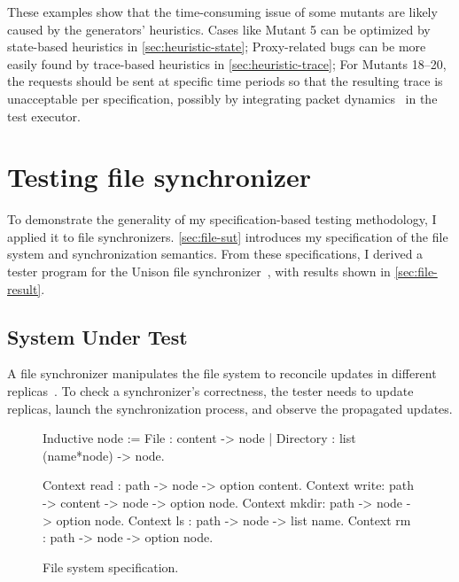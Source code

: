 These examples show that the time-consuming issue of some mutants are likely
caused by the generators' heuristics.  Cases like Mutant 5 can be optimized by
state-based heuristics in \autoref{sec:heuristic-state}; Proxy-related bugs can
be more easily found by trace-based heuristics in \autoref{sec:heuristic-trace};
For Mutants 18--20, the requests should be sent at specific time periods so that
the resulting trace is unacceptable per specification, possibly by integrating
packet dynamics~\cite{pkt-dyn} in the test executor.

\section{Testing file synchronizer}
\label{sec:sync}

To demonstrate the generality of my specification-based testing methodology, I
applied it to file synchronizers.  \autoref{sec:file-sut} introduces my
specification of the file system and synchronization semantics.  From these
specifications, I derived a tester program for the Unison file
synchronizer~\cite{unison}, with results shown in \autoref{sec:file-result}.

\subsection{System Under Test}
\label{sec:file-sut}
A file synchronizer manipulates the file system to reconcile updates in
different replicas~\cite{what-sync}.  To check a synchronizer's correctness, the
tester needs to update replicas, launch the synchronization process, and observe
the propagated updates.

\begin{figure}
\begin{coq}
  Inductive node :=
    File      : content          -> node
  | Directory : list (name*node) -> node.

  Context read : path -> node    -> option content.
  Context write: path -> content -> node -> option node.
  Context mkdir: path -> node    -> option node.
  Context ls   : path -> node    -> list name.
  Context rm   : path -> node    -> option node.
\end{coq}
\caption{File system specification.}
\label{fig:file-spec}
\end{figure}

